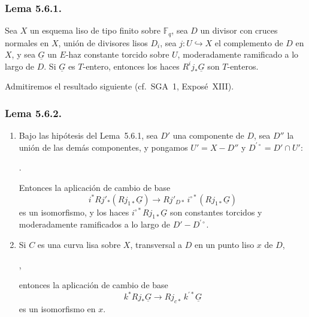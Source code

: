 \pageoriginale

\subsubsection*{Lema 5.6.1.}
Sea $X$ un esquema liso de tipo finito sobre $\mathbb F_q$, sea $D$ un
divisor con cruces normales en $X$, unión de divisores lisos $D_i$, sea
$j:U\hookrightarrow X$ el complemento de $D$ en $X$, y sea $\underline G$
un $E$-haz constante torcido sobre $U$, moderadamente ramificado a lo
largo de $D$. Si $\underline G$ es $T$-entero, entonces los haces
$R^ij_*\underline G$ son $T$-enteros.

Admitiremos el resultado siguiente (cf.~SGA~1, Exposé~XIII).

\subsubsection*{Lema 5.6.2.}
\begin{enumerate}[label=(\roman*)]
\item Bajo las hipótesis del Lema~5.6.1, sea $D'$ una componente de $D$,
sea $D''$ la unión de las demás componentes, y pongamos
$U'=X-D''$ y $D^{\prime\circ}=D'\cap U'$:
\begin{center}
\qquad .
\end{center}
Entonces la aplicación de cambio de base
\[
i^*Rj'_*(Rj_{1*}\underline G)
\longrightarrow
Rj'_{D*}\,i^{\circ *}(Rj_{1*}\underline G)
\]
es un isomorfismo, y los haces
$i^{\circ *}Rj_{1*}\underline G$ son constantes torcidos y moderadamente
ramificados a lo largo de $D'-D^{\prime\circ}$.

\item Si $C$ es una curva lisa sobre $X$, transversal a $D$ en un punto
liso $x$ de $D$,
\begin{center}
\qquad ,
\end{center}
entonces la aplicación de cambio de base
\[
k^*Rj_*\underline G\longrightarrow Rj_{c*}\,k^{\prime *}\underline G
\]
es un isomorfismo en $x$.
\end{enumerate}


